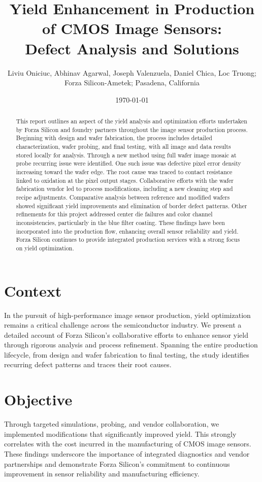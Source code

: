 \documentclass[letterpaper,twocolumn,fleqn]{article}
\title{Yield Enhancement in Production of CMOS Image Sensors: \\ Defect Analysis and Solutions }
\author{ Liviu Oniciuc, Abhinav Agarwal, Joseph Valenzuela, Daniel Chica, Loc Truong; Forza Silicon-Ametek; Pasadena, California}
\date{\today} %
\begin{document}
 
\maketitle 
\thispagestyle{empty} %


\begin{abstract}
This report outlines an aspect of the yield analysis and optimization efforts undertaken by Forza Silicon and foundry partners throughout the image sensor production process. Beginning with design and wafer fabrication, the process includes detailed characterization, wafer probing, and final testing, with all image and data results stored locally for analysis. Through a new method using full wafer image mosaic at probe recurring issue were identified. One such issue was defective pixel error density increasing toward the wafer edge. The root cause was traced to contact resistance linked to oxidation at the pixel output stages. Collaborative efforts with the wafer fabrication vendor led to process modifications, including a new cleaning step and recipe adjustments. Comparative analysis between reference and modified wafers showed significant yield improvements and elimination of border defect patterns. Other refinements for this project addressed center die failures and color channel inconsistencies, particularly in the blue filter coating. These findings have been incorporated into the production flow, enhancing overall sensor reliability and yield. Forza Silicon continues to provide integrated production services with a strong focus on yield optimization.
\end{abstract}

\section{Context}
\label{sec:intro}
In the pursuit of high-performance image sensor production, yield optimization remains a critical challenge across the semiconductor industry. We present a detailed account of Forza Silicon’s collaborative efforts to enhance sensor yield through rigorous analysis and process refinement. Spanning the entire production lifecycle, from design and wafer fabrication to final testing, the study identifies recurring defect patterns and traces their root causes.

\section{Objective}
Through targeted simulations, probing, and vendor collaboration, we implemented modifications that significantly improved yield. This strongly correlates with the cost incurred in the manufacturing of CMOS image sensors. These findings underscore the importance of integrated diagnostics and vendor partnerships and demonstrate Forza Silicon’s commitment to continuous improvement in sensor reliability and manufacturing efficiency. 
\end{document}
